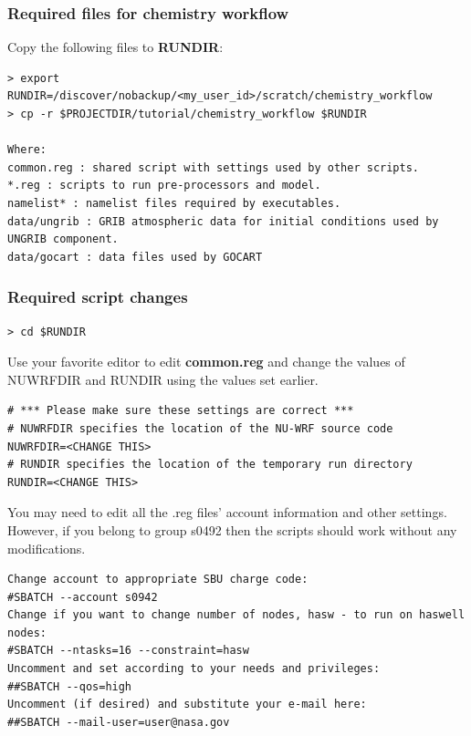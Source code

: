 \begin{frame}[fragile]\frametitle{Required files for chemistry workflow}

Copy the following files to \textbf{RUNDIR}:
\begin{lstlisting}
> export RUNDIR=/discover/nobackup/<my_user_id>/scratch/chemistry_workflow
> cp -r $PROJECTDIR/tutorial/chemistry_workflow $RUNDIR

Where:
common.reg : shared script with settings used by other scripts.
*.reg : scripts to run pre-processors and model.
namelist* : namelist files required by executables.
data/ungrib : GRIB atmospheric data for initial conditions used by UNGRIB component.
data/gocart : data files used by GOCART
\end{lstlisting}

\end{frame}

\begin{frame}[fragile]
\frametitle{Required script changes}
\verbatimfont{\scriptsize}%
\begin{verbatim}
> cd $RUNDIR
\end{verbatim}
 Use your favorite editor to edit \textbf{common.reg} and change the values of NUWRFDIR and RUNDIR using the values set earlier.
\verbatimfont{\scriptsize}%
\begin{verbatim}
# *** Please make sure these settings are correct ***
# NUWRFDIR specifies the location of the NU-WRF source code
NUWRFDIR=<CHANGE THIS>
# RUNDIR specifies the location of the temporary run directory
RUNDIR=<CHANGE THIS>
\end{verbatim}
You may need to edit all the .reg files' account information and other settings. However, if you belong to group s0492 then the scripts should work without any modifications.
\verbatimfont{\scriptsize}%
\begin{verbatim}
Change account to appropriate SBU charge code:
#SBATCH --account s0942 
Change if you want to change number of nodes, hasw - to run on haswell nodes:
#SBATCH --ntasks=16 --constraint=hasw
Uncomment and set according to your needs and privileges:
##SBATCH --qos=high 
Uncomment (if desired) and substitute your e-mail here:
##SBATCH --mail-user=user@nasa.gov 
\end{verbatim}

\end{frame}

